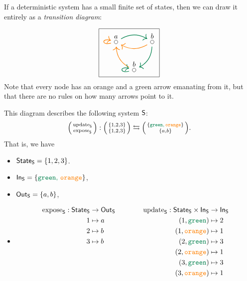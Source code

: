 \documentclass[DynamicalBook]{subfiles}
\begin{document}
\begin{example}\label{ex.transition_diagram_discrete}
  If a deterministic system has a small finite set of states, then we can draw it
entirely as a \emph{transition diagram}:

\[
\begin{tikzpicture}
	\node[draw] {
  \begin{tikzcd}[column sep=small]
  	\LMO{a}\ar[rr, dgreen, thick, bend left]\ar[loop left, thick, orange]&&
  	\LMO{b}\ar[ll, thick, orange, bend left]\ar[dl, bend left, thick, dgreen]\\&
  	\LMO{b} \ar[ul, thick, orange, bend left] \ar[loop left, thick, dgreen]
  \end{tikzcd}
  };
\end{tikzpicture}
\]
Note that every node has an orange and a green arrow emanating from it, but that there are no rules on how many arrows point to it.

This diagram describes the following system $\mathsf{S}$:
  $$\lens{\update{S}}{\expose{S}} : \lens{\{1, 2, 3\}}{\{1, 2, 3\}} \leftrightarrows \lens{\{{\color{dgreen} \const{green},\, {\color{orange} \const{orange}}}\}}{\{a, b\}}.$$ 
That is, we have
\begin{itemize}
\item $\mathsf{State}_{\mathsf{S}} = \{1, 2, 3\}$.
\item $\In{S} = \{{\color{dgreen} \const{green},\, {\color{orange} \const{orange}}}\}$,
\item $\mathsf{Out}_{\mathsf{S}} = \{a, b\}$,
\item \[\begin{aligned}
        \expose{S} : \State{S} &\to \Out{S} \\
        1 &\mapsto a \\
        2 &\mapsto b \\
        3 &\mapsto b \\~\\~\\~\\
      \end{aligned} \quad\quad\quad\quad
 \begin{aligned}
        \update{S} : \State{S} \times \In{S} &\to \In{S} \\
        (1, {\color{dgreen} \const{green}}) &\mapsto 2 \\
        (1, {\color{orange} \const{orange}}) &\mapsto 1 \\
        (2, {\color{dgreen} \const{green}}) &\mapsto 3 \\
        (2, {\color{orange} \const{orange}}) &\mapsto 1 \\
        (3, {\color{dgreen} \const{green}}) &\mapsto 3 \\
        (3, {\color{orange} \const{orange}}) &\mapsto 1
      \end{aligned}
      \]
\end{itemize}


\end{example}
\end{document}
